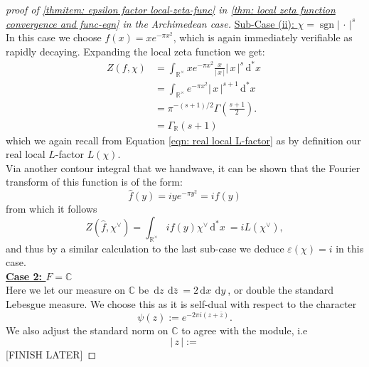 \documentclass[11pt, x11names]{book}
\newcommand{\rr}{\mathbb{R}}
\newcommand{\cc}{\mathbb{C}}
\renewcommand{\bar}[1]{\overline{#1}}
\renewcommand{\brack}[1]{\left(   #1 \right)}
\newcommand{\abs}[1]{\left| \, #1  \,\right|}
\renewcommand{\hat}{\widehat}
\DeclareMathOperator{\sgn}{sgn}
\newcommand{\dx}{\, \mathrm{d}x \ }
\newcommand{\dy}{\, \mathrm{d}y \ }
\newcommand{\dz}{\, \mathrm{d}z \ }
\renewcommand{\d}[1]{\, \mathrm{d}#1 \ }
\begin{document}
\begin{proof}[proof of \ref{thmitem: epsilon factor local-zeta-func} in \ref{thm: local zeta function convergence and func-eqn} in the Archimedean case]
\underline{Sub-Case (ii): $\chi = \sgn \abs{\cdot}^s$}\\
In this case we choose $f(x) = xe^{-\pi x^2}$, which is again immediately verifiable as rapidly decaying. Expanding the local zeta function we get:
\begin{align*}
    Z(f, \chi) &= \int_{\rr^\times} x e^{-\pi x^2} \frac{x}{\abs{x}} \abs{x}^s \d{^*x}\\
    &= \int_{\rr^\times} e^{-\pi x^2} \abs{x}^{s+1} \d{^*x}\\
    &= \pi^{-(s+1)/2} \Gamma\brack{\frac{s+1}{2}}.\\
    &= \Gamma_\rr(s+1)
\end{align*}
which we again recall from Equation \ref{eqn: real local L-factor} as by definition our real local $L$-factor $L(\chi)$.\\
Via another contour integral that we handwave, it can be shown that the Fourier transform of this function is of the form:
\begin{equation*}
    \hat{f}(y) = i y e^{- \pi y^2 } = i f(y)
\end{equation*} 
from which it follows 
\begin{equation*}
    Z(\hat{f}, \chi^\lor) = \int_{\rr^\times} i f(y) \chi^\lor \d{^*x} = i L(\chi^\lor),
\end{equation*}
and thus by a similar calculation to the last sub-case we deduce $\varepsilon(\chi) = i$ in this case.\\

\textbf{\underline{Case 2: $F = \cc$}}\\
Here we let our measure on $\cc$ be $\dz \d{\bar{z}} = 2 \dx\dy$, or double the standard Lebesgue measure. We choose this as it is self-dual with respect to the character
\begin{equation*}
    \psi(z) := e^{- 2 \pi i (z + \bar{z})}.
\end{equation*} 
We also adjust the standard norm on $\cc$ to agree with the module, i.e
\begin{equation*}
    \abs{z} := 
\end{equation*}
[FINISH LATER]
\end{proof}
\end{document}
